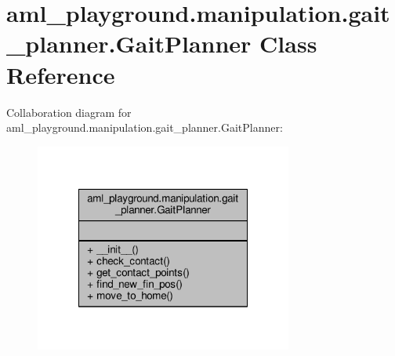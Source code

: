 \hypertarget{classaml__playground_1_1manipulation_1_1gait__planner_1_1_gait_planner}{\section{aml\-\_\-playground.\-manipulation.\-gait\-\_\-planner.\-Gait\-Planner Class Reference}
\label{classaml__playground_1_1manipulation_1_1gait__planner_1_1_gait_planner}
}


Collaboration diagram for aml\-\_\-playground.\-manipulation.\-gait\-\_\-planner.\-Gait\-Planner\-:
\nopagebreak
\begin{figure}[H]
\begin{center}
\leavevmode
\includegraphics[width=240pt]{classaml__playground_1_1manipulation_1_1gait__planner_1_1_gait_planner__coll__graph}
\end{center}
\end{figure}

